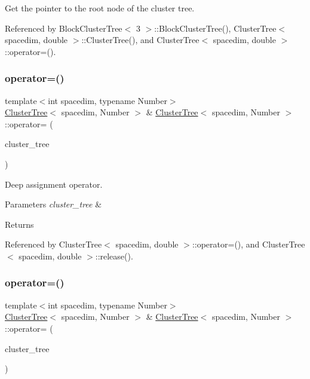 Get the pointer to the root node of the cluster tree. 

Referenced by Block\+Cluster\+Tree$<$ 3 $>$\+::\+Block\+Cluster\+Tree(), Cluster\+Tree$<$ spacedim, double $>$\+::\+Cluster\+Tree(), and Cluster\+Tree$<$ spacedim, double $>$\+::operator=().

\mbox{\label{classClusterTree_a3a4e51a1a09f759f085ab140db914af9}} 
\subsubsection{\texorpdfstring{operator=()}{operator=()}\hspace{0.1cm}{\footnotesize\ttfamily [1/2]}}
{\footnotesize\ttfamily template$<$int spacedim, typename Number$>$ \\
\hyperlink{classClusterTree}{Cluster\+Tree}$<$ spacedim, Number $>$ \& \hyperlink{classClusterTree}{Cluster\+Tree}$<$ spacedim, Number $>$\+::operator= (\begin{DoxyParamCaption}\item[{const \hyperlink{classClusterTree}{Cluster\+Tree}$<$ spacedim, Number $>$ \&}]{cluster\+\_\+tree }\end{DoxyParamCaption})}

Deep assignment operator.


\begin{DoxyParams}{Parameters}
{\em cluster\+\_\+tree} & \\
\hline
\end{DoxyParams}
\begin{DoxyReturn}{Returns}

\end{DoxyReturn}


Referenced by Cluster\+Tree$<$ spacedim, double $>$\+::operator=(), and Cluster\+Tree$<$ spacedim, double $>$\+::release().

\mbox{\label{classClusterTree_a9700796d8fb849b3171c0c7d461a2380}} 
\subsubsection{\texorpdfstring{operator=()}{operator=()}\hspace{0.1cm}{\footnotesize\ttfamily [2/2]}}
{\footnotesize\ttfamily template$<$int spacedim, typename Number$>$ \\
\hyperlink{classClusterTree}{Cluster\+Tree}$<$ spacedim, Number $>$ \& \hyperlink{classClusterTree}{Cluster\+Tree}$<$ spacedim, Number $>$\+::operator= (\begin{DoxyParamCaption}\item[{\hyperlink{classClusterTree}{Cluster\+Tree}$<$ spacedim, Number $>$ \&\&}]{cluster\+\_\+tree }\end{DoxyParamCaption})}

